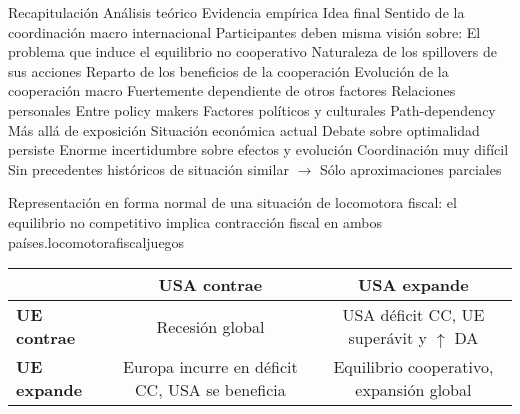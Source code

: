 \documentclass{nuevotema}
\begin{document}
\begin{esquemal}
		\2 Recapitulación
			\3 Análisis teórico
			\3 Evidencia empírica
		\2 Idea final
			\3 Sentido de la coordinación macro internacional
				\4 Participantes deben misma visión sobre:
				\4[] El problema que induce el equilibrio no cooperativo
				\4[] Naturaleza de los spillovers de sus acciones
				\4[] Reparto de los beneficios de la cooperación
			\3 Evolución de la cooperación macro
				\4 Fuertemente dependiente de otros factores
				\4 Relaciones personales
				\4[] Entre policy makers
				\4 Factores políticos y culturales
				\4 Path-dependency
				\4[$\then$] Más allá de exposición
			\3 Situación económica actual
				\4 Debate sobre optimalidad persiste
				\4 Enorme incertidumbre sobre efectos y evolución
				\4 Coordinación muy difícil
				\4[] Sin precedentes históricos de situación similar
				\4[] $\to$ Sólo aproximaciones parciales
				
\end{esquemal}























\graficas

\begin{tabla}{Representación en forma normal de una situación de locomotora fiscal: el equilibrio no competitivo implica contracción fiscal en ambos países.}{locomotorafiscaljuegos}
	\begin{tabular}{l || c | c}
		& \textbf{USA contrae} & \textbf{USA expande} \\ \hline \hline
		\textbf{UE contrae} & Recesión global & USA déficit CC, UE superávit y $\uparrow$ DA  \\ \hline
		\textbf{UE expande} & Europa incurre en déficit CC, USA se beneficia & Equilibrio cooperativo, expansión global \\ \hline
	\end{tabular}
\end{tabla}
\end{document}
